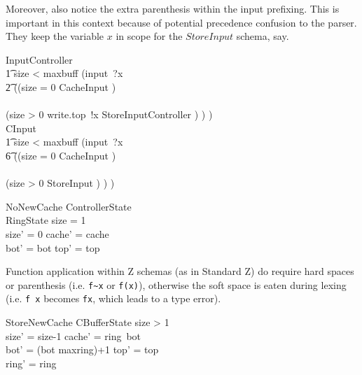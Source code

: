 \documentclass{article}
\begin{document}
Moreover, also notice the extra parenthesis within the input prefixing. This is important 
in this context because of potential precedence confusion to the parser. They keep the
variable $x$ in scope for the $StoreInput$ schema, say.
%
\begin{circusaction}
    InputController ~~\circdef~~ \\
        \t1 \lcircguard size < maxbuff \rcircguard \circguard (input~?x \then \\
           \t2 \circblockbegin
            ((\lcircguard size = 0 \rcircguard \circguard \lschexpract CacheInput \rschexpract) \\
            \extchoice \\
             (\lcircguard size > 0 \rcircguard \circguard write.top~!x \then \lschexpract StoreInputController \rschexpract)
            ) 
            \circblockend) \\
    CInput \circdef \\
        \t1 \lcircguard size < maxbuff \rcircguard \circguard (input~?x \then \\
        	\t6 \circblockbegin
            ((\lcircguard size = 0 \rcircguard \circguard \lschexpract CacheInput \rschexpract) \\
            \extchoice \\
            (\lcircguard size > 0 \rcircguard \circguard \lschexpract StoreInput \rschexpract) )
           \circblockend)
\end{circusaction}

\begin{schema}{NoNewCache}
    \Delta ControllerState
    \\%
    \Xi RingState
\where
           size = 1
            \\%
            size' = 0 \land cache' = cache
            \\%
            bot' = bot \land top' = top
\end{schema}


Function application within Z schemas (as in Standard Z) do require hard spaces
or parenthesis (i.e. \verb'f~x' or \verb'f(x)'), otherwise the soft space is eaten during
lexing (i.e. \verb'f x' becomes \verb'fx', which leads to a type error).
%
\begin{schema}{StoreNewCache}
    \Delta CBufferState
\where
            size > 1
            \\
            size' = size-1 \land cache' = ring~bot
            \\
            bot' = (bot \mod maxring)+1 \land top' = top
            \\
            ring' = ring
\end{schema}
\end{document}
